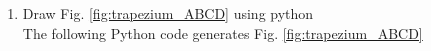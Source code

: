 \begin{enumerate}[label=\thesection.\arabic*.,ref=\thesection.\theenumi]
%
\item Draw Fig. \ref{fig:trapezium_ABCD} using python	
\\
\solution The  following Python code generates Fig. \ref{fig:trapezium_ABCD}
%
\begin{lstlisting}

\end{lstlisting}
\end{enumerate}
